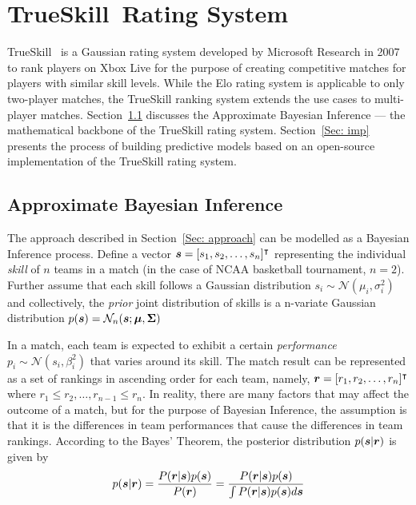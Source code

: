 \chapter{TrueSkill\texttrademark~Rating System}\label{Chap:3}
TrueSkill~\cite{TS07} is a Gaussian rating system developed by Microsoft Research in 2007 to rank players on Xbox Live for the purpose of creating competitive matches for players with similar skill levels. While the Elo rating system is applicable to only two-player matches, the TrueSkill ranking system extends the use cases to multi-player matches. Section~\ref{Sec: tmm} discusses the Approximate Bayesian Inference --- the mathematical backbone of the TrueSkill rating system. Section~\ref{Sec: imp} presents the process of building predictive models based on an open-source implementation of the TrueSkill rating system. 

\section{Approximate Bayesian Inference}\label{Sec: tmm}

The approach described in Section~\ref{Sec: approach} can be modelled as a Bayesian Inference process. Define a vector $\bm{s}  = [s_{1}, s_{2}, \ldots, s_{n}]^{\intercal}$ representing the individual \emph{skill} of $n$ teams in a match (in the case of NCAA basketball tournament, $n = 2$). Further assume that each skill follows a Gaussian distribution $s_{i} \sim \mathcal{N}(\mu_{i}, \sigma_{i}^{2})$ and collectively, the \emph{prior} joint distribution of skills is a n-variate Gaussian distribution $p(\bm{s}) = \mathcal{N}_{n}(\bm{s}; \bm{\mu}, \bm{\Sigma})$

In a match, each team is expected to exhibit a certain \emph{performance} $p_{i} \sim \mathcal{N}(s_{i}, \beta_{i}^{2})$ that varies around its skill. The match result can be represented as a set of rankings in ascending order for each team, namely, $\bm{r} = [r_{1}, r_{2}, \ldots, r_{n}]^{\intercal}$ where $r_{1} \leq r_{2}, \ldots, r_{n - 1} \leq r_{n}$. In reality, there are many factors that may affect the outcome of a match, but for the purpose of Bayesian Inference, the assumption is that it is the differences in team performances that cause the differences in team rankings. According to the Bayes' Theorem, the posterior distribution $p(\bm{s} | \bm{r})$ is given by
\begin{equation}\label{Eqn: bayes}
p(\bm{s} | \bm{r}) = \frac{P(\bm{r} | \bm{s})p(\bm{s})}{P(\bm{r})} = \frac{P(\bm{r} | \bm{s})p(\bm{s})}{\int P(\bm{r} | \bm{s})p(\bm{s})d\bm{s}}
\end{equation}

